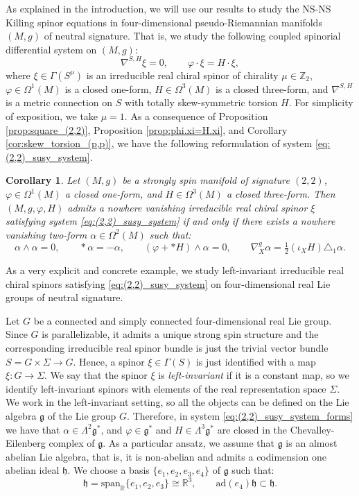 \documentclass[10pt,reqno]{amsart}
\newtheorem{corollary}[theorem]{Corollary}
\theoremstyle{definition}
\theoremstyle{remark}
\newcommand{\Z}{\mathbb{Z}}
\newcommand{\R}{\mathbb{R}}
\begin{document}
As explained in the introduction, we will use our results to study the NS-NS Killing spinor equations in four-dimensional pseudo-Riemannian manifolds $(M,g)$ of neutral signature. That is, we study the following coupled spinorial differential system on $(M,g)$: \begin{equation}\label{eq:(2,2)_susy_system}
    \nabla^{S,H}\xi=0,\qquad\varphi\cdot\xi=H\cdot\xi,
\end{equation} where $\xi\in\Gamma(S^\mu)$ is an irreducible real chiral spinor of chirality $\mu\in\Z_2$, $\varphi\in\Omega^1(M)$ is a closed one-form, $H\in\Omega^3(M)$ is a closed three-form, and $\nabla^{S,H}$ is a metric connection on $S$ with totally skew-symmetric torsion $H$. For simplicity of exposition, we take $\mu=1$. As a consequence of Proposition \ref{prop:square_(2,2)}, Proposition \ref{prop:phi.xi=H.xi}, and Corollary \ref{cor:skew_torsion_(p,p)}, we have the following reformulation of system \eqref{eq:(2,2)_susy_system}.

\begin{corollary}
    Let $(M,g)$ be a strongly spin manifold of signature $(2,2)$, $\varphi\in\Omega^1(M)$ a closed one-form, and $H\in\Omega^3(M)$ a closed three-form. Then $(M,g,\varphi,H)$ admits a nowhere vanishing irreducible real chiral spinor $\xi$ satisfying system \eqref{eq:(2,2)_susy_system} if and only if there exists a nowhere vanishing two-form $\alpha\in\Omega^2(M)$ such that: \begin{equation}\label{eq:(2,2)_susy_system_forms}
        \alpha\wedge\alpha=0,\qquad*\alpha=-\alpha,\qquad(\varphi+*H)\wedge\alpha=0,\qquad\nabla^g_X\alpha=\tfrac{1}{2}(\iota_XH)\triangle_1\alpha.
    \end{equation}
\end{corollary}

As a very explicit and concrete example, we study left-invariant irreducible real chiral spinors satisfying \eqref{eq:(2,2)_susy_system} on four-dimensional real Lie groups of neutral signature.\medskip

Let $G$ be a connected and simply connected four-dimensional real Lie group. Since $G$ is parallelizable, it admits a unique strong spin structure and the corresponding irreducible real spinor bundle is just the trivial vector bundle $S=G\times\Sigma\to G$. Hence, a spinor $\xi\in\Gamma(S)$ is just identified with a map $\xi\colon G\to\Sigma$. We say that the spinor $\xi$ is \emph{left-invariant} if it is a constant map, so we identify left-invariant spinors with elements of the real representation space $\Sigma$. We work in the left-invariant setting, so all the objects can be defined on the Lie algebra $\mathfrak{g}$ of the Lie group $G$. Therefore, in system \eqref{eq:(2,2)_susy_system_forms} we have that $\alpha\in\Lambda^2\mathfrak{g}^*$, and $\varphi\in\mathfrak{g}^*$ and $H\in\Lambda^3\mathfrak{g}^*$ are closed in the Chevalley-Eilenberg complex of $\mathfrak{g}$. As a particular ansatz, we assume that $\mathfrak{g}$ is an almost abelian Lie algebra, that is, it is non-abelian and admits a codimension one abelian ideal $\mathfrak{h}$. We choose a basis $\{e_1,e_2,e_3,e_4\}$ of $\mathfrak{g}$ such that: $$\mathfrak{h}=\mathrm{span}_\R\{e_1,e_2,e_3\}\cong\R^3,\qquad\mathrm{ad}(e_4)\mathfrak{h}\subset\mathfrak{h}.$$
\end{document}
